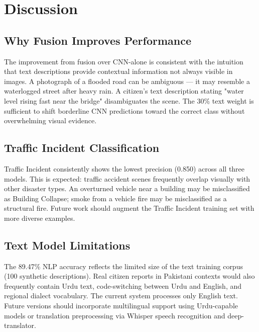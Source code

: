 \documentclass[conference]{IEEEtran}
\begin{document}
\section{Discussion}
\label{sec:discussion}

\subsection{Why Fusion Improves Performance}

The improvement from fusion over CNN-alone is consistent with the intuition that text descriptions provide contextual information not always visible in images. A photograph of a flooded road can be ambiguous — it may resemble a waterlogged street after heavy rain. A citizen's text description stating "water level rising fast near the bridge" disambiguates the scene. The 30\% text weight is sufficient to shift borderline CNN predictions toward the correct class without overwhelming visual evidence.

\subsection{Traffic Incident Classification}

Traffic Incident consistently shows the lowest precision (0.850) across all three models. This is expected: traffic accident scenes frequently overlap visually with other disaster types. An overturned vehicle near a building may be misclassified as Building Collapse; smoke from a vehicle fire may be misclassified as a structural fire. Future work should augment the Traffic Incident training set with more diverse examples.

\subsection{Text Model Limitations}

The 89.47\% NLP accuracy reflects the limited size of the text training corpus (100 synthetic descriptions). Real citizen reports in Pakistani contexts would also frequently contain Urdu text, code-switching between Urdu and English, and regional dialect vocabulary. The current system processes only English text. Future versions should incorporate multilingual support using Urdu-capable models or translation preprocessing via Whisper speech recognition and deep-translator.
\end{document}
